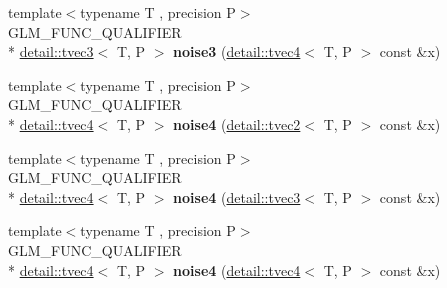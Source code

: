 \begin{DoxyCompactItemize}
\item 
\hypertarget{namespaceglm_aefcd263a48e42f99258c9dc05c131fdb}{{\footnotesize template$<$typename T , precision P$>$ }\\G\-L\-M\-\_\-\-F\-U\-N\-C\-\_\-\-Q\-U\-A\-L\-I\-F\-I\-E\-R \\*
\hyperlink{structglm_1_1detail_1_1tvec3}{detail\-::tvec3}$<$ T, P $>$ {\bfseries noise3} (\hyperlink{structglm_1_1detail_1_1tvec4}{detail\-::tvec4}$<$ T, P $>$ const \&x)}\label{namespaceglm_aefcd263a48e42f99258c9dc05c131fdb}

\item 
\hypertarget{namespaceglm_aa64dcec1a8c06703a5c26218f1c83c63}{{\footnotesize template$<$typename T , precision P$>$ }\\G\-L\-M\-\_\-\-F\-U\-N\-C\-\_\-\-Q\-U\-A\-L\-I\-F\-I\-E\-R \\*
\hyperlink{structglm_1_1detail_1_1tvec4}{detail\-::tvec4}$<$ T, P $>$ {\bfseries noise4} (\hyperlink{structglm_1_1detail_1_1tvec2}{detail\-::tvec2}$<$ T, P $>$ const \&x)}\label{namespaceglm_aa64dcec1a8c06703a5c26218f1c83c63}

\item 
\hypertarget{namespaceglm_aabc399aa2343a49622ac52a25cc5f961}{{\footnotesize template$<$typename T , precision P$>$ }\\G\-L\-M\-\_\-\-F\-U\-N\-C\-\_\-\-Q\-U\-A\-L\-I\-F\-I\-E\-R \\*
\hyperlink{structglm_1_1detail_1_1tvec4}{detail\-::tvec4}$<$ T, P $>$ {\bfseries noise4} (\hyperlink{structglm_1_1detail_1_1tvec3}{detail\-::tvec3}$<$ T, P $>$ const \&x)}\label{namespaceglm_aabc399aa2343a49622ac52a25cc5f961}

\item 
\hypertarget{namespaceglm_ae69869ab78e3158bcd45cc8105d49fd1}{{\footnotesize template$<$typename T , precision P$>$ }\\G\-L\-M\-\_\-\-F\-U\-N\-C\-\_\-\-Q\-U\-A\-L\-I\-F\-I\-E\-R \\*
\hyperlink{structglm_1_1detail_1_1tvec4}{detail\-::tvec4}$<$ T, P $>$ {\bfseries noise4} (\hyperlink{structglm_1_1detail_1_1tvec4}{detail\-::tvec4}$<$ T, P $>$ const \&x)}\label{namespaceglm_ae69869ab78e3158bcd45cc8105d49fd1}


\end{DoxyCompactItemize}
